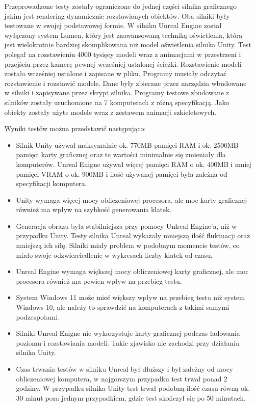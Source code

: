 \documentclass[12pt,twoside]{article}
\begin{document}
Przeprowadzone testy zostały ograniczone do jednej części silnika graficznego
jakim jest rendering dynamicznie rozstawionych obiektów. Oba silniki były
testowane w swojej podstawowej formie. W silniku Unreal Engine został wyłączony
system Lumen, który jest zaawansowaną techniką oświetlenia, która jest
wielokrotnie bardziej skomplikowana niż model oświetlenia silnika Unity. Test
polegał na rozstawieniu 4000 tysięcy modeli wraz z animacjami w przestrzeni i
przejściu przez kamerę pewnej wcześniej ustalonej ścieżki. Rozstawienie modeli
zostało wcześniej ustalone i zapisane w pliku. Programy musiały odczytać
rozstawienie i rozstawić modele. Dane były zbierane przez narzędzia wbudowane w
silniki i zapisywane przez skrypt silnika. Programy testowe zbudowane z silników
zostały uruchomione na 7 komputerach z różną specyfikacją. Jako obiekty zostały
użyte modele wraz z zestawem animacji szkieletowych. 

Wyniki testów można przedstawić następująco:
\begin{itemize}
\item Silnik Unity używał maksymalnie ok. 770MB pamięci RAM i ok. 2500MB pamięci
karty graficznej oraz te wartości minimalnie się zmieniały dla komputerów.
Unreal Enigne używał więcej pamięci RAM o ok. 400MB i mniej pamięci VRAM o ok.
900MB i ilość używanej pamięci była zależna od specyfikacji komputera. 

\item Unity wymaga więcej mocy obliczeniowej procesora, ale moc karty graficznej
również ma wpływ na szybkość generowania klatek. 

\item Generacja obrazu była stabilniejsza przy pomocy Unlreal Engine’a, niż w
przypadku Unity. Testy silnika Unreal wykazały mniejszą ilość fluktuacji oraz mniejszą ich siłę. Silniki miały problem w podobnym momencie testów, co miało
swoje odzwierciedlenie w wykresach liczby klatek od czasu. 


\item Unreal Engine wymaga większej mocy obliczeniowej karty graficznej, ale moc
procesora również ma pewien wpływ na przebieg testu.

\item System Windows 11 może mieć większy wpływ na przebieg testu niż system
Windows 10, ale należy to sprawdzić na komputerach z takimi samymi podzespołami. 

\item Silniki Unreal Enigne nie wykorzystuje karty graficznej podczas ładowania
poziomu i rozstawiania modeli. Takie zjawisko nie zachodzi przy działaniu
silnika Unity. 

\item Czas trwania testów w silniku Unreal był dłuższy i był zależny od mocy
obliczeniowej komputera, w najgorszym przypadku test trwał ponad 2 godziny. W
przypadku silnika Unity test trwał podobną ilość czasu równą ok. 30 minut poza
jednym przypadkiem, gdzie test skończył się po 50 minutach. 


\end{itemize} 
\end{document}
